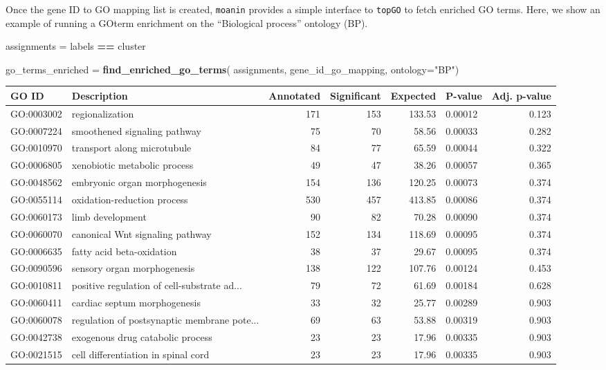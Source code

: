 \documentclass[9pt,a4paper,]{extarticle}
\newenvironment{Shaded}{\begin{snugshade}}{\end{snugshade}}
\newcommand{\DataTypeTok}[1]{\textcolor[rgb]{0.13,0.29,0.53}{#1}}
\newcommand{\KeywordTok}[1]{\textcolor[rgb]{0.13,0.29,0.53}{\textbf{#1}}}
\newcommand{\NormalTok}[1]{#1}
\newcommand{\OperatorTok}[1]{\textcolor[rgb]{0.81,0.36,0.00}{\textbf{#1}}}
\newcommand{\StringTok}[1]{\textcolor[rgb]{0.31,0.60,0.02}{#1}}
\begin{document}
Once the gene ID to GO mapping list is created, \texttt{moanin} provides a simple
interface to \texttt{topGO} to fetch enriched GO terms. Here, we show an example of
running a GOterm enrichment on the ``Biological process'' ontology (BP).

\begin{Shaded}
\begin{Highlighting}[]
\NormalTok{assignments =}\StringTok{ }\NormalTok{labels }\OperatorTok{==}\StringTok{ }\NormalTok{cluster}

\NormalTok{go_terms_enriched =}\StringTok{ }\KeywordTok{find_enriched_go_terms}\NormalTok{(}
\NormalTok{    assignments,}
\NormalTok{    gene_id_go_mapping, }\DataTypeTok{ontology=}\StringTok{"BP"}\NormalTok{)}
\end{Highlighting}
\end{Shaded}

\begin{tabular}{llrrrlr}
\toprule
GO ID & Description & Annotated & Significant & Expected & P-value & Adj. p-value\\
\midrule
GO:0003002 & regionalization & 171 & 153 & 133.53 & 0.00012 & 0.123\\
GO:0007224 & smoothened signaling pathway & 75 & 70 & 58.56 & 0.00033 & 0.282\\
GO:0010970 & transport along microtubule & 84 & 77 & 65.59 & 0.00044 & 0.322\\
GO:0006805 & xenobiotic metabolic process & 49 & 47 & 38.26 & 0.00057 & 0.365\\
GO:0048562 & embryonic organ morphogenesis & 154 & 136 & 120.25 & 0.00073 & 0.374\\
\addlinespace
GO:0055114 & oxidation-reduction process & 530 & 457 & 413.85 & 0.00086 & 0.374\\
GO:0060173 & limb development & 90 & 82 & 70.28 & 0.00090 & 0.374\\
GO:0060070 & canonical Wnt signaling pathway & 152 & 134 & 118.69 & 0.00095 & 0.374\\
GO:0006635 & fatty acid beta-oxidation & 38 & 37 & 29.67 & 0.00095 & 0.374\\
GO:0090596 & sensory organ morphogenesis & 138 & 122 & 107.76 & 0.00124 & 0.453\\
\addlinespace
GO:0010811 & positive regulation of cell-substrate ad... & 79 & 72 & 61.69 & 0.00184 & 0.628\\
GO:0060411 & cardiac septum morphogenesis & 33 & 32 & 25.77 & 0.00289 & 0.903\\
GO:0060078 & regulation of postsynaptic membrane pote... & 69 & 63 & 53.88 & 0.00319 & 0.903\\
GO:0042738 & exogenous drug catabolic process & 23 & 23 & 17.96 & 0.00335 & 0.903\\
GO:0021515 & cell differentiation in spinal cord & 23 & 23 & 17.96 & 0.00335 & 0.903\\
\bottomrule
\end{tabular}
\end{document}
